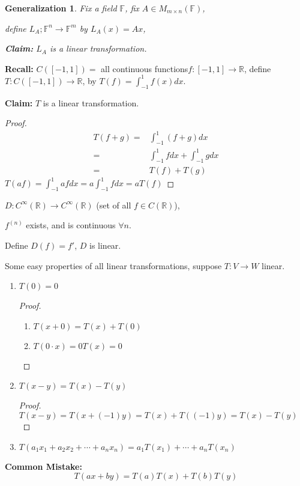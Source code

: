 \documentclass[12pt]{article}
\theoremstyle{plain}
\newtheorem{generalization}{Generalization}[subsection]
\newcommand{\mR}{{\mathbb{R}}}
\newcommand{\mF}{{\mathbb{F}}}
\begin{document}
		\begin{generalization}
			Fix a field $\mF$, fix $A \in M_{m\times n} (\mF)$, 

			define $L_A ; \mF^n \to \mF^m$  by $L_A (x) = Ax$, 

			\textbf{Claim: }$L_A$ is a linear transformation. 
		\end{generalization}

		\textbf{Recall:}
		$C([-1,1])=$ all continuous functions$ f:[-1,1] \to \mR$,
		define $T:C([-1,1]) \to \mR$, by $T(f) = \int_{-1}^1 f(x)dx$. 

		\textbf{Claim:} $T$ is a linear transformation. 
		\begin{proof}
			\begin{align*}
				T(f+g)  
				=& \int_{-1}^1 (f+g) dx\\
				=& \int_{-1}^1 f dx + \int_{-1}^1 g dx\\
				=& T(f) + T(g)
			\end{align*}
			$T(af) = \int_{-1}^1 af dx = a\int_{-1}^1 fdx = aT(f)$ 
		\end{proof}

		$D : C^{\infty}(\mR) \to C^{\infty}(\mR)$ (set of all $f\in C(\mR)$),

		$f^{(n)}$ exists, and is continuous $\forall n$. 

		Define $D(f) = f'$, $D$ is linear. 

		Some easy properties of all linear transformations, suppose 
		$T : V \to W$ linear. 
		\begin{enumerate}
			\item $T(0)=0$ 
				\begin{proof}
					\begin{enumerate}
					\item $T(x+0) = T(x) + T(0)$
					\item $T(0\cdot x) = 0T(x) = 0$
					\end{enumerate}
				\end{proof}
			\item $T(x-y) = T(x) - T(y)$
				\begin{proof}
					$T(x-y) = T(x+(-1)y) = T(x) + T((-1)y) = T(x) - T(y)$
				\end{proof}
			\item $T(a_1x_1+a_2x_2+\cdots+a_nx_n) = a_1 T(x_1) + \cdots
				+a_nT(x_n)$
		\end{enumerate}


		{\color{Gray}
		\textbf{Common Mistake:}
		\[
			T(ax+by) = T(a) T(x) + T(b)T(y)
		\]
		}
\end{document}
